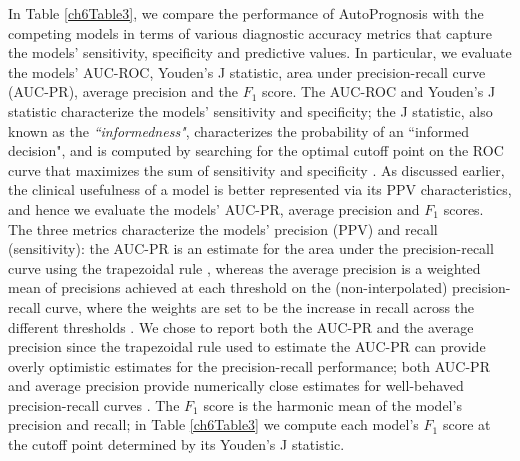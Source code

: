 \documentclass [PhD] {uclathes}
\begin{document}
In Table \ref{ch6Table3}, we compare the performance of AutoPrognosis with the competing models in terms of various diagnostic accuracy metrics that capture the models' sensitivity, specificity and predictive values. In particular, we evaluate the models' AUC-ROC, Youden's J statistic, area under precision-recall curve (AUC-PR), average precision and the $F_1$ score. The AUC-ROC and Youden's J statistic characterize the models' sensitivity and specificity; the J statistic, also known as the {\it ``informedness"}, characterizes the probability of an ``informed decision", and is computed by searching for the optimal cutoff point on the ROC curve that maximizes the sum of sensitivity and specificity \cite{fluss2005estimation, altman1994diagnostic}. As discussed earlier, the clinical usefulness of a model is better represented via its PPV characteristics, and hence we evaluate the models' AUC-PR, average precision and $F_1$ scores. The three metrics characterize the models' precision (PPV) and recall (sensitivity): the AUC-PR is an estimate for the area under the precision-recall curve using the trapezoidal rule \cite{davis2006relationship,saito2015precision}, whereas the average precision is a weighted mean of precisions achieved at each threshold on the (non-interpolated) precision-recall curve, where the weights are set to be the increase in recall across the different thresholds \cite{zhu2004recall}. We chose to report both the AUC-PR and the average precision since the trapezoidal rule used to estimate the AUC-PR can provide overly optimistic estimates for the precision-recall performance; both AUC-PR and average precision provide numerically close estimates for well-behaved precision-recall curves \cite{flach2015precision}. The $F_1$ score is the harmonic mean of the model's precision and recall; in Table \ref{ch6Table3} we compute each model's $F_1$ score at the cutoff point determined by its Youden's J statistic. 
\end{document}

